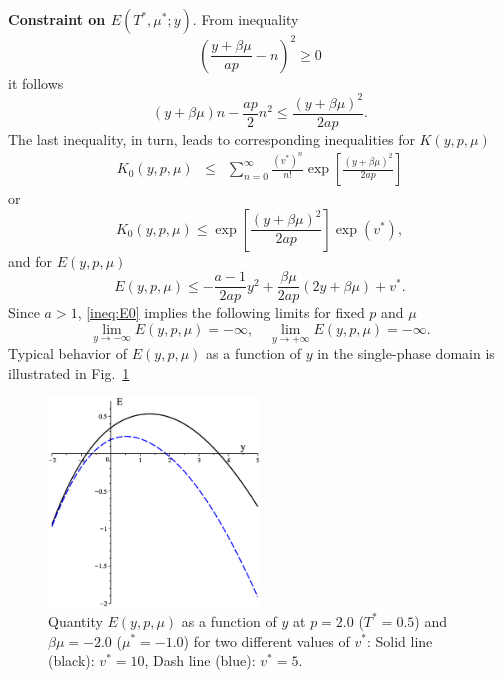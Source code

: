 \documentclass[12pt]{article}
\numberwithin{equation}{section}
\begin{document}
	\textbf{Constraint on $E(T^*,\mu^*;y)$}. From inequality
	\begin{equation}
		\left(\frac{y+\beta\mu}{ap} - n\right)^2 \geq 0
	\end{equation}
	it follows
	\begin{equation}
		(y+\beta\mu)n - \frac{ap}{2}n^2 \leq \frac{(y+\beta\mu)^2}{2ap}.
	\end{equation}
	The last inequality, in turn, leads to corresponding inequalities for $K(y,p,\mu)$
	\begin{eqnarray}
		K_0(y,p,\mu) & \leq & \sum_{n=0}^{\infty}\frac{(v^*)^n}{n!} \exp[\frac{(y+\beta\mu)^2}{2ap}]
	\end{eqnarray}
	or
	\begin{equation}
		K_0(y,p,\mu) \leq \exp[\frac{(y+\beta\mu)^2}{2ap}] \exp(v^*),
	\end{equation}
	and for $E(y,p,\mu)$
	\begin{equation}
		\label{ineq:E0}
		E(y,p,\mu) \leq -\frac{a-1}{2ap}y^2 + \frac{\beta\mu}{2ap}(2y+\beta\mu) + v^*.
	\end{equation}
	Since $a>1$, \eqref{ineq:E0} implies the following limits for fixed $p$ and $\mu$
	\begin{equation}
		\lim_{y \to -\infty} E(y,p,\mu) = -\infty, \quad \lim\limits_{y \to +\infty} E(y,p,\mu) = -\infty.
	\end{equation}
	Typical behavior of $E(y,p,\mu)$ as a function of $y$ in the single-phase domain is illustrated in Fig.~\ref{fig:E0_vs_y}
	\begin{figure}[htbp]
		\includegraphics[width=0.5\textwidth,angle=0]{E0_vs_y2}
		\centering
		\captionsetup{width=0.6\textwidth}
		\caption{Quantity $E(y,p,\mu)$ as a function of $y$ at $p=2.0$ ($T^*=0.5$) and $\beta\mu=-2.0$ ($\mu^*=-1.0$) for two different values of $v^*$: Solid line (black): $v^* = 10$, Dash line (blue): $v^* = 5$.}
		\label{fig:E0_vs_y}
	\end{figure}
	
\end{document}
